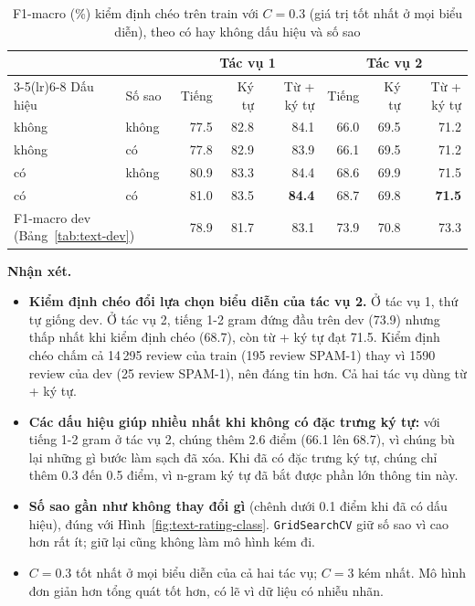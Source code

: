 \begin{table}[H]
\centering
\caption{F1-macro (\%) kiểm định chéo trên train với $C = 0.3$ (giá trị tốt nhất ở mọi biểu diễn), theo có hay không dấu hiệu và số sao}
\label{tab:text-cv}
\small
\begin{tabular}{llrrrrrr}
\toprule
& & \multicolumn{3}{c}{Tác vụ 1} & \multicolumn{3}{c}{Tác vụ 2}\\
\cmidrule(lr){3-5}\cmidrule(lr){6-8}
Dấu hiệu & Số sao & Tiếng & Ký tự & Từ + ký tự & Tiếng & Ký tự & Từ + ký tự\\
\midrule
không & không & 77.5 & 82.8 & 84.1 & 66.0 & 69.5 & 71.2\\
không & có & 77.8 & 82.9 & 83.9 & 66.1 & 69.5 & 71.2\\
có & không & 80.9 & 83.3 & 84.4 & 68.6 & 69.9 & 71.5\\
có & có & 81.0 & 83.5 & \textbf{84.4} & 68.7 & 69.8 & \textbf{71.5}\\
\midrule
\multicolumn{2}{l}{F1-macro dev (Bảng~\ref{tab:text-dev})} & 78.9 & 81.7 & 83.1 & 73.9 & 70.8 & 73.3\\
\bottomrule
\end{tabular}
\end{table}

\textbf{Nhận xét.}
\begin{itemize}[leftmargin=1.5cm]
    \item \textbf{Kiểm định chéo đổi lựa chọn biểu diễn của tác vụ 2.} Ở tác vụ 1, thứ tự giống dev. Ở tác vụ 2, tiếng 1-2 gram đứng đầu trên dev (73.9)
          nhưng thấp nhất khi kiểm định chéo (68.7), còn từ + ký tự đạt 71.5. Kiểm định chéo chấm cả 14\,295 review của train (195 review SPAM-1)
          thay vì 1590 review của dev (25 review SPAM-1), nên đáng tin hơn. Cả hai tác vụ dùng từ + ký tự.
    \item \textbf{Các dấu hiệu giúp nhiều nhất khi không có đặc trưng ký tự:} với tiếng 1-2 gram ở tác vụ 2, chúng thêm 2.6 điểm (66.1 lên 68.7),
          vì chúng bù lại những gì bước làm sạch đã xóa. Khi đã có đặc trưng ký tự, chúng chỉ thêm 0.3 đến 0.5 điểm, vì n-gram ký tự đã bắt được phần lớn thông tin này.
    \item \textbf{Số sao gần như không thay đổi gì} (chênh dưới 0.1 điểm khi đã có dấu hiệu), đúng với Hình~\ref{fig:text-rating-class}. \texttt{GridSearchCV}
          giữ số sao vì cao hơn rất ít; giữ lại cũng không làm mô hình kém đi.
    \item $C = 0.3$ tốt nhất ở mọi biểu diễn của cả hai tác vụ; $C = 3$ kém nhất. Mô hình đơn giản hơn tổng quát tốt hơn, có lẽ vì dữ liệu có nhiễu nhãn.
\end{itemize}

